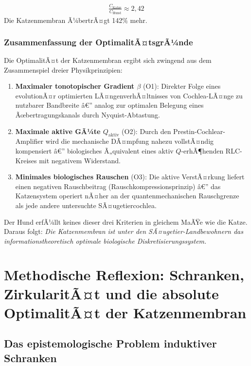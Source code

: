 ﻿\documentclass[12pt,a4paper,titlepage]{report}
\begin{document}
\begin{align}
	\frac{C_{\text{Katze}}}{C_{\text{Hund}}} \approx 2{,}42
\end{align}
Die Katzenmembran Ã¼bertrÃ¤gt 142$\%$ mehr.

\subsection{Zusammenfassung der OptimalitÃ¤tsgrÃ¼nde}

Die OptimalitÃ¤t der Katzenmembran ergibt sich zwingend aus dem Zusammenspiel
dreier Physikprinzipien:

\begin{enumerate}[leftmargin=2em, label=\textbf{(P\arabic*)}]
\item \textbf{Maximaler tonotopischer Gradient $\beta$} (O1):
Direkter Folge eines evolutionÃ¤r optimierten LÃ¤ngenverhÃ¤ltnisses von
Cochlea-LÃ¤nge zu nutzbarer Bandbreite â€” analog zur
optimalen Belegung eines Ãœbertragungskanals durch Nyquist-Abtastung.
\item \textbf{Maximale aktive GÃ¼te $Q_{\text{aktiv}}$} (O2):
Durch den Prestin-Cochlear-Amplifier wird die mechanische DÃ¤mpfung
nahezu vollstÃ¤ndig kompensiert â€” biologisches Ã„quivalent eines
aktiv $Q$-erhÃ¶henden RLC-Kreises mit negativem Widerstand.
\item \textbf{Minimales biologisches Rauschen} (O3):
Die aktive VerstÃ¤rkung liefert einen negativen Rauschbeitrag
(Rauschkompressionsprinzip) â€” das Katzensystem operiert nÃ¤her
an der quantenmechanischen Rauschgrenze als jede andere untersuchte
SÃ¤ugetiercochlea.
\end{enumerate}

Der Hund erfÃ¼llt keines dieser drei Kriterien in gleichem MaÃŸe wie die Katze.
Daraus folgt: \emph{Die Katzenmembran ist unter den SÃ¤ugetier-Landbewohnern
das informationstheoretisch optimale biologische Diskretisierungssystem.}

\chapter{Methodische Reflexion: Schranken, ZirkularitÃ¤t und die absolute
OptimalitÃ¤t der Katzenmembran}

\section{Das epistemologische Problem induktiver Schranken}
\end{document}
